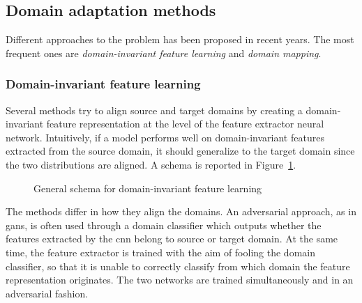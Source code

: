 \documentclass[%
    corpo=12pt,
    twoside,
    stile=classica,   
    tipotesi=magistrale,
    evenboxes,
    english,
	numerazioneromana,
]{toptesi}
\begin{document}
\subsection{Domain adaptation methods}
Different approaches to the problem has been proposed in recent years. The most frequent ones are \textit{domain-invariant feature learning} and \textit{domain mapping}.

\subsubsection{Domain-invariant feature learning}
Several methods try to align source and target domains by creating a domain-invariant feature representation at the level of the feature extractor neural network. Intuitively, if a model performs well on domain-invariant features extracted from the source domain, it should generalize to the target domain since the two distributions are aligned. A schema is reported in Figure~\ref{fig:align}.

\begin{figure}[ht]
	\centering
	\caption{General schema for domain-invariant feature learning\cite{wilson2020survey}}
	\label{fig:align}
\end{figure}

The methods differ in how they align the domains. An adversarial approach, as in \glspl{gan}, is often used through a domain classifier which outputs whether the features extracted by the \gls{cnn} belong to source or target domain. At the same time, the feature extractor is trained with the aim of fooling the domain classifier, so that it is unable to correctly classify from which domain the feature representation originates. The two networks are trained simultaneously and in an adversarial fashion.
\end{document}
